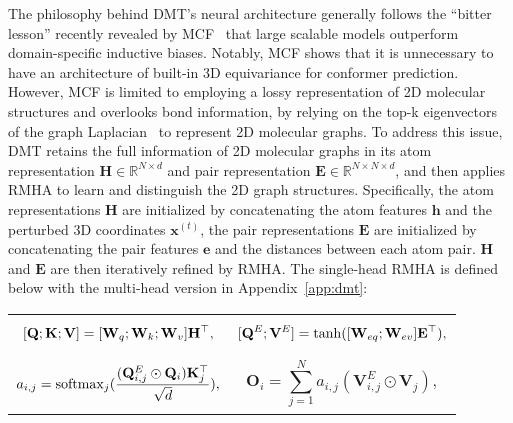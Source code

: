 The philosophy behind DMT's neural architecture generally follows the ``bitter lesson'' recently revealed by MCF~\citep{MCF} that large scalable models outperform domain-specific inductive biases. Notably, MCF shows that it is unnecessary to have an architecture of built-in 3D equivariance for conformer prediction. However, MCF is limited to employing a lossy representation of 2D molecular structures and overlooks bond information, by relying on the top-k eigenvectors of the graph Laplacian~\citep{maskey2022generalized} to represent 2D molecular graphs. To address this issue, DMT retains the full information of 2D molecular graphs in its atom representation $\mathbf{H}\in \mathbb{R}^{N\times d}$ and pair representation $\mathbf{E}\in \mathbb{R}^{N\times N \times d}$, and then applies RMHA to learn and distinguish the 2D graph structures.
Specifically, the atom representations $\mathbf{H}$ are initialized by concatenating the atom features $\mathbf{h}$ and the perturbed 3D coordinates $\mathbf{x}^{(t)}$, the pair representations $\mathbf{E}$ are initialized by concatenating the pair features $\mathbf{e}$ and the distances between each atom pair. $\mathbf{H}$ and $\mathbf{E}$ are then iteratively refined by RMHA. The single-head RMHA is defined below with the multi-head version in Appendix~\ref{app:dmt}:
\vspace{-3mm}

\begin{tabular}{p{6.5cm}p{6.5cm}}
\begin{equation}\label{eq:a}
[\mathbf{Q}; \mathbf{K}; \mathbf{V}] = [\mathbf{W}_{q}; \mathbf{W}_{k}; \mathbf{W}_{v}] {\mathbf{H}}^{\top},
\end{equation}
&
\vspace{-5mm}
\begin{equation}\label{eq:b}
[\mathbf{Q}^E;\mathbf{V}^E] = \tanh([\mathbf{W}_{eq};\mathbf{W}_{ev}] {\mathbf{E}}^{\top}),
\end{equation} \\
\vspace{-12mm}
\begin{equation}\label{eq:c}
a_{i,j}=\mathrm{softmax}_{j}(\frac{(\mathbf{Q}^E_{i,j}\odot \mathbf{Q}_i){\mathbf{K}}^{\top}_j}{\sqrt{d}}),
\end{equation}
&
\vspace{-10.5mm}
\begin{equation}\label{eq:d}
\mathbf{O}_i = \sum_{j=1}^{N} a_{i,j}(\mathbf{V}^E_{i,j}\odot \mathbf{V}_j),
\end{equation}
\end{tabular}

